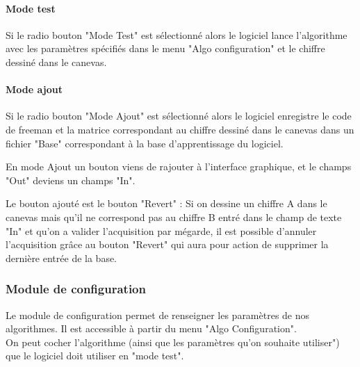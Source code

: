 \documentclass[10pt,a4paper]{report}
\begin{document}
\paragraph*{Mode test}
\begin{flushleft}
Si le radio bouton "Mode Test" est sélectionné alors le logiciel lance l'algorithme avec les paramètres spécifiés dans le menu "Algo configuration" et le chiffre dessiné dans le canevas.
\end{flushleft}


\paragraph*{Mode ajout}
\begin{flushleft}
Si le radio bouton "Mode Ajout" est sélectionné alors le logiciel enregistre le code de freeman et la matrice correspondant au chiffre dessiné dans le canevas dans un fichier "Base" correspondant à la base d'apprentissage du logiciel.

En mode Ajout un bouton viens de rajouter à l'interface graphique, et le champs "Out" deviens un champs "In".

\item Le bouton ajouté est le bouton "Revert" : Si on dessine un chiffre A dans le canevas mais qu'il ne correspond pas au chiffre B entré dans le champ de texte "In" et qu'on a valider l'acquisition par mégarde, il est possible d'annuler l'acquisition grâce au bouton "Revert" qui aura pour action de supprimer la dernière entrée de la base.

\end{flushleft}

\subsubsection{Module de configuration}

\begin{flushleft}
Le module de configuration permet de renseigner les paramètres de nos algorithmes. Il est accessible à partir du menu "Algo Configuration".\\
On peut cocher l'algorithme (ainsi que les paramètres qu'on souhaite utiliser") que le logiciel doit utiliser en "mode test". 
\end{flushleft}
\end{document}
